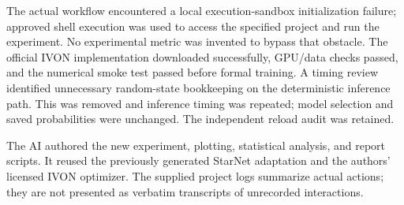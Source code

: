 \documentclass[11pt,a4paper]{article}
\begin{document}
The actual workflow encountered a local execution-sandbox initialization failure;
approved shell execution was used to access the specified project and run the
experiment. No experimental metric was invented to bypass that obstacle.
The official IVON implementation downloaded successfully, GPU/data checks passed,
and the numerical smoke test passed before formal training. A timing review
identified unnecessary random-state bookkeeping on the deterministic inference
path. This was removed and inference timing was repeated; model selection and
saved probabilities were unchanged. The independent reload audit was retained.

The AI authored the new experiment, plotting, statistical analysis, and report
scripts. It reused the previously generated StarNet adaptation and the authors'
licensed IVON optimizer. The supplied project logs summarize actual actions;
they are not presented as verbatim transcripts of unrecorded interactions.
\end{document}
